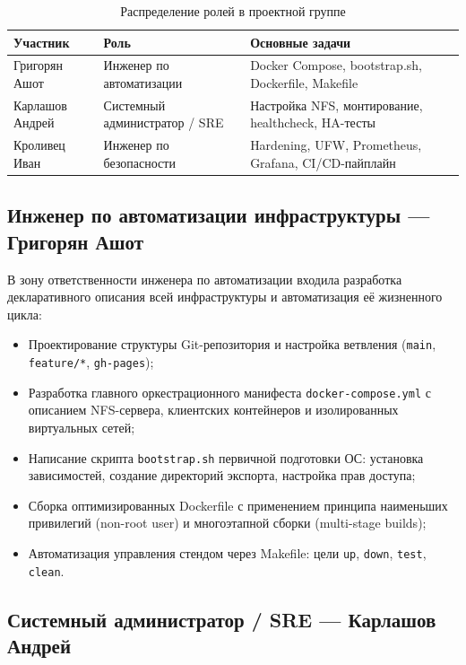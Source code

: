 \documentclass[14pt,a4paper]{extarticle}
\begin{document}
	\begin{table}[h!]
		\centering
		\small
		\begin{tabularx}{\textwidth}{|l|l|X|}
			\hline
			\textbf{Участник} & \textbf{Роль} & \textbf{Основные задачи} \\
			\hline
			Григорян Ашот & Инженер по автоматизации & Docker Compose, bootstrap.sh, Dockerfile, Makefile \\
			\hline
			Карлашов Андрей & Системный администратор / SRE & Настройка NFS, монтирование, healthcheck, HA-тесты \\
			\hline
			Кроливец Иван & Инженер по безопасности & Hardening, UFW, Prometheus, Grafana, CI/CD-пайплайн \\
			\hline
		\end{tabularx}
		\caption{Распределение ролей в проектной группе}
	\end{table}
	
	\subsection{Инженер по автоматизации инфраструктуры --- Григорян Ашот}
	
	В зону ответственности инженера по автоматизации входила разработка декларативного
	описания всей инфраструктуры и автоматизация её жизненного цикла:
	
	\begin{itemize}
		\item Проектирование структуры Git-репозитория и настройка ветвления
		(\texttt{main}, \texttt{feature/*}, \texttt{gh-pages});
		\item Разработка главного оркестрационного манифеста \texttt{docker-compose.yml}
		с описанием NFS-сервера, клиентских контейнеров и изолированных виртуальных сетей;
		\item Написание скрипта \texttt{bootstrap.sh} первичной подготовки ОС: установка
		зависимостей, создание директорий экспорта, настройка прав доступа;
		\item Сборка оптимизированных Dockerfile с применением принципа наименьших
		привилегий (non-root user) и многоэтапной сборки (multi-stage builds);
		\item Автоматизация управления стендом через Makefile: цели
		\texttt{up}, \texttt{down}, \texttt{test}, \texttt{clean}.
	\end{itemize}
	
	\subsection{Системный администратор / SRE --- Карлашов Андрей}
	
\end{document}
